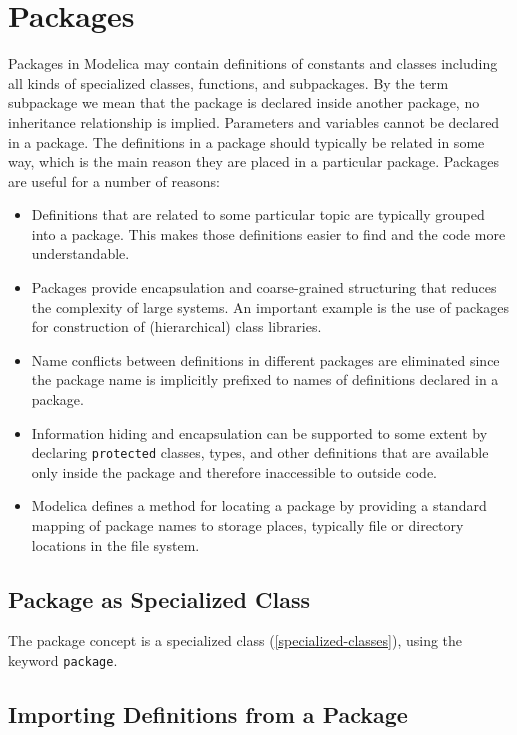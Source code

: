 \chapter{Packages}\label{packages}

Packages in Modelica may contain definitions of constants and
classes including all kinds of specialized classes, functions, and
subpackages. By the term subpackage we mean that the package is declared
inside another package, no inheritance relationship is implied.
Parameters and variables cannot be declared in a package. The
definitions in a package should typically be related in some way, which
is the main reason they are placed in a particular package. Packages are
useful for a number of reasons:
\begin{itemize}
\item
  Definitions that are related to some particular topic are typically
  grouped into a package. This makes those definitions easier to find
  and the code more understandable.
\item
  Packages provide encapsulation and coarse-grained structuring
  that reduces the complexity of large systems. An important example is
  the use of packages for construction of (hierarchical) class
  libraries.
\item
  Name conflicts between definitions in different packages are
  eliminated since the package name is implicitly prefixed to names of
  definitions declared in a package.
\item
  Information hiding and encapsulation can be supported to some
  extent by declaring \lstinline!protected! classes, types, and other
  definitions that are available only inside the package and therefore
  inaccessible to outside code.
\item
  Modelica defines a method for locating a package by providing a
  standard mapping of package names to storage places, typically file or
  directory locations in the file system.
\end{itemize}

\section{Package as Specialized Class}\label{package-as-specialized-class}

The package concept is a specialized class (\cref{specialized-classes}), using the
keyword \lstinline!package!.

\section{Importing Definitions from a Package}\label{importing-definitions-from-a-package}

